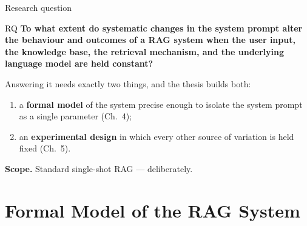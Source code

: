 \documentclass[11pt,aspectratio=169]{beamer}
\begin{document}
\begin{frame}{Research question}
  \begin{block}{RQ}
    \textbf{To what extent do systematic changes in the system prompt alter
    the behaviour and outcomes of a RAG system when the user input, the
    knowledge base, the retrieval mechanism, and the underlying language
    model are held constant?}
  \end{block}
  \medskip
  Answering it needs exactly two things, and the thesis builds both:
  \begin{enumerate}
    \item a \textbf{formal model} of the system precise enough to isolate the
          system prompt as a single parameter (Ch.~4);
    \item an \textbf{experimental design} in which every other source of
          variation is held fixed (Ch.~5).
  \end{enumerate}
  \medskip
  \small
  \textbf{Scope.} Standard single-shot RAG --- deliberately.
\end{frame}

\section{Formal Model of the RAG System}
\end{document}
